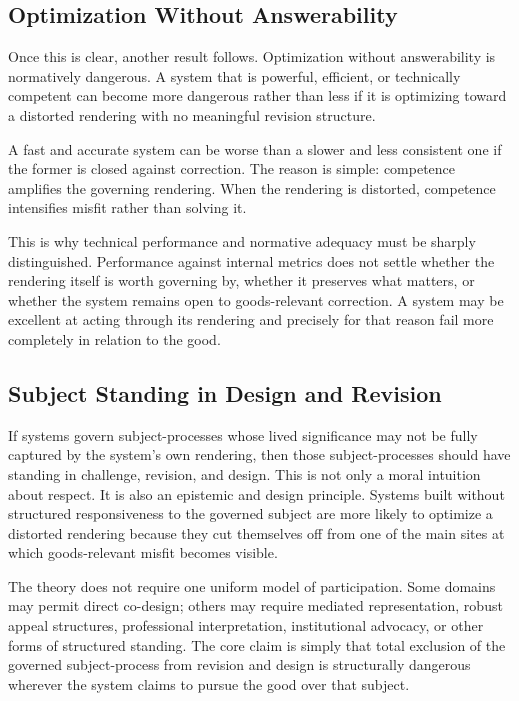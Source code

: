 \documentclass[11pt]{article}
\begin{document}
\subsection{Optimization Without Answerability}

Once this is clear, another result follows. Optimization without answerability is normatively dangerous. A system that is powerful, efficient, or technically competent can become more dangerous rather than less if it is optimizing toward a distorted rendering with no meaningful revision structure.

A fast and accurate system can be worse than a slower and less consistent one if the former is closed against correction. The reason is simple: competence amplifies the governing rendering. When the rendering is distorted, competence intensifies misfit rather than solving it.\cite{ObermeyerEtAl2019DissectingRacialBias,SelbstEtAl2019FairnessAbstraction}

This is why technical performance and normative adequacy must be sharply distinguished. Performance against internal metrics does not settle whether the rendering itself is worth governing by, whether it preserves what matters, or whether the system remains open to goods-relevant correction. A system may be excellent at acting through its rendering and precisely for that reason fail more completely in relation to the good.

\subsection{Subject Standing in Design and Revision}

If systems govern subject-processes whose lived significance may not be fully captured by the system's own rendering, then those subject-processes should have standing in challenge, revision, and design. This is not only a moral intuition about respect. It is also an epistemic and design principle. Systems built without structured responsiveness to the governed subject are more likely to optimize a distorted rendering because they cut themselves off from one of the main sites at which goods-relevant misfit becomes visible.

The theory does not require one uniform model of participation. Some domains may permit direct co-design; others may require mediated representation, robust appeal structures, professional interpretation, institutional advocacy, or other forms of structured standing. The core claim is simply that total exclusion of the governed subject-process from revision and design is structurally dangerous wherever the system claims to pursue the good over that subject.
\end{document}
